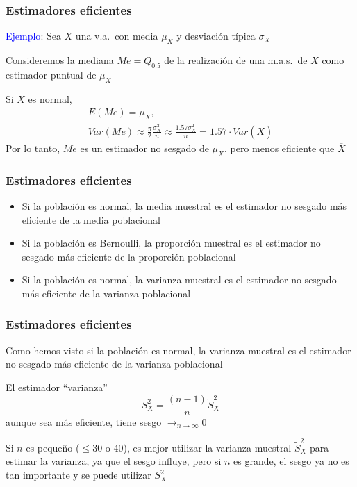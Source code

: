 \documentclass[12pt,t]{beamer}\usepackage[]{graphicx}\usepackage[]{color}
\newcommand{\blue}[1]{\textcolor{blue}{#1}}
\renewcommand{\leq}{\leqslant}
\def\tendeix{{\displaystyle\mathop{\longrightarrow}_{\scriptscriptstyle
n\to\infty}}}
\theoremstyle{plain}
\theoremstyle{definition}
\begin{document}
\begin{frame}
\frametitle{Estimadores eficientes}

\blue{Ejemplo}: Sea $X$ una v.a.\ con media $\mu_X$ y desviación típica $\sigma_X$
\medskip

Consideremos la mediana $Me=Q_{0.5}$ de la realización de una m.a.s.\ de $X$ como estimador puntual de $\mu_X$
\medskip

Si $X$ es normal, 
$$
\begin{array}{l}
E(Me)=\mu_X,\\
\displaystyle  Var(Me)\approx \frac{\pi}{2}
     \frac{\sigma_{X}^2}{n}\approx \frac{1.57 \sigma_{X}^2}{n}=1.57\cdot Var(\overline{X})
\end{array}
$$
Por  lo tanto, $Me$ es un estimador no sesgado de   $\mu_X$, pero menos eficiente que $\overline{X}$



\end{frame}


\begin{frame}
\frametitle{Estimadores  eficientes}

\begin{itemize}
\item Si la población es normal, la media muestral es el estimador
no sesgado más eficiente de la media poblacional
\medskip

\item Si la población es Bernoulli, la proporción muestral es el estimador
no sesgado más eficiente de la proporción poblacional
\medskip

\item Si la población es normal, la varianza muestral es el estimador
no sesgado  más eficiente de la varianza poblacional
 \end{itemize}




\end{frame}


\begin{frame}
\frametitle{Estimadores  eficientes}

Como hemos visto  si la población es normal, la varianza muestral es el estimador
no sesgado  más eficiente de la varianza poblacional
\medskip

El estimador ``varianza''
$$
S_X^2=\frac{(n-1)}{n} \widetilde{S}_X^2
$$   
aunque sea   más eficiente, tiene sesgo $\tendeix 0$
\medskip

Si $n$ es pequeño ($\leq 30$ o 40), es mejor utilizar  la varianza muestral $\widetilde{S}_X^2$ para estimar la varianza, ya que el sesgo influye, pero si $n$ es grande, el sesgo ya no es tan importante y se puede utilizar $S_X^2$


\end{frame}
\end{document}
